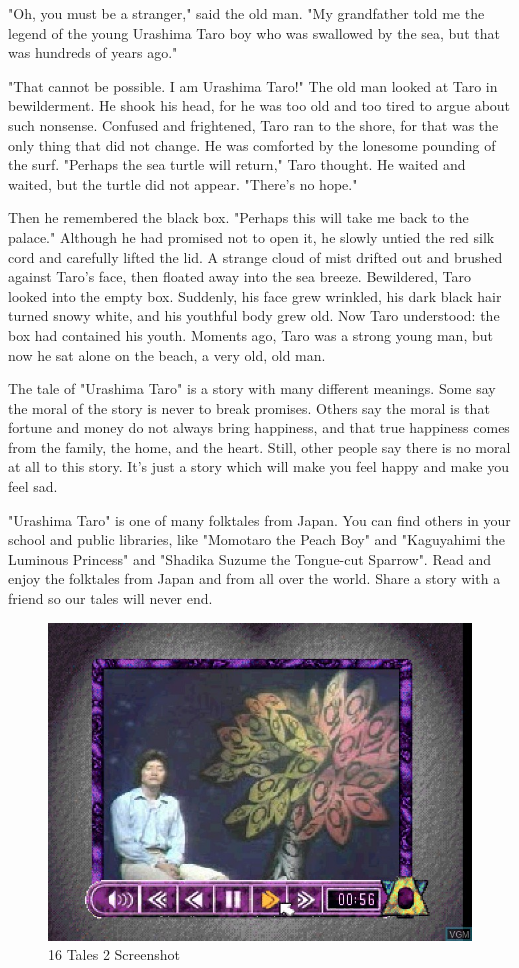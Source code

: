 "Oh, you must be a stranger," said the old man. "My grandfather told me the legend of the young Urashima Taro boy who was swallowed by the sea, but that was hundreds of years ago."

"That cannot be possible. I am Urashima Taro!" The old man looked at Taro in bewilderment. He shook his head, for he was too old and too tired to argue about such nonsense. Confused and frightened, Taro ran to the shore, for that was the only thing that did not change. He was comforted by the lonesome pounding of the surf. "Perhaps the sea turtle will return," Taro thought. He waited and waited, but the turtle did not appear. "There's no hope."

Then he remembered the black box. "Perhaps this will take me back to the palace." Although he had promised not to open it, he slowly untied the red silk cord and carefully lifted the lid. A strange cloud of mist drifted out and brushed against Taro's face, then floated away into the sea breeze. Bewildered, Taro looked into the empty box. Suddenly, his face grew wrinkled, his dark black hair turned snowy white, and his youthful body grew old. Now Taro understood: the box had contained his youth. Moments ago, Taro was a strong young man, but now he sat alone on the beach, a very old, old man.

The tale of "Urashima Taro" is a story with many different meanings. Some say the moral of the story is never to break promises. Others say the moral is that fortune and money do not always bring happiness, and that true happiness comes from the family, the home, and the heart. Still, other people say there is no moral at all to this story. It's just a story which will make you feel happy and make you feel sad.

"Urashima Taro" is one of many folktales from Japan. You can find others in your school and public libraries, like "Momotaro the Peach Boy" and "Kaguyahimi the Luminous Princess" and "Shadika Suzume the Tongue-cut Sparrow". Read and enjoy the folktales from Japan and from all over the world. Share a story with a friend so our tales will never end.

\clearpage
\newpage

\begin{figure}
    \centering
    \includegraphics[width=\textwidth/2]{"./Games/16Tales/Images/16Tales2Screenshot.png"}
    \caption{16 Tales 2 Screenshot}
\end{figure}